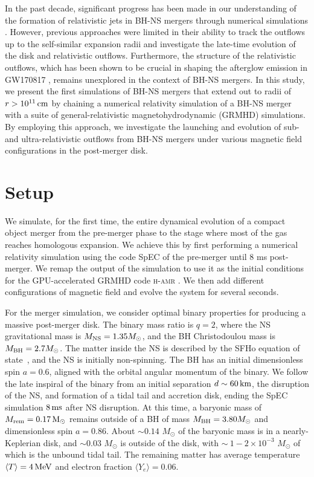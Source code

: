 \documentclass[twocolumn,dvipsnames]{aastex62}
\newcommand{\msun}{\,{M_{\odot}}}
\begin{document}
In the past decade, significant progress has been made in our understanding of the formation of relativistic jets in BH-NS mergers through numerical simulations \citep{Etienne2012,Kiuchi2015,Paschalidis2015,Ruiz2018,Hayashi2022a,Hayashi2022b}. However, previous approaches were limited in their ability to track the outflows up to the self-similar expansion radii and investigate the late-time evolution of the disk and relativistic outflows. Furthermore, the structure of the relativistic outflows, which has been shown to be crucial in shaping the afterglow emission in GW170817 \citep[e.g.,][]{Alexander2017,Margutti2017,Mooley2018a,Mooley2018b,Lazzati2018,Lyman2018,Troja2018,Ghirlanda2019,Lamb2019}, remains unexplored in the context of BH-NS mergers. In this study, we present the first simulations of BH-NS mergers that extend out to radii of $r > 10^{11}\,{\rm cm} $ by chaining a numerical relativity simulation of a BH-NS merger with a suite of general-relativistic magnetohydrodynamic (GRMHD) simulations. By employing this approach, we investigate the launching and evolution of sub- and ultra-relativistic outflows from BH-NS mergers under various magnetic field configurations in the post-merger disk.

\section{Setup}\label{sec:setup}

We simulate, for the first time, the entire dynamical evolution of a compact object merger from the pre-merger phase to the stage where most of the gas reaches homologous expansion. We achieve this by first performing a numerical relativity simulation using the code SpEC \citep{spec} of the pre-merger until 8 ms post-merger. We remap the output of the simulation to use it as the initial conditions for the GPU-accelerated GRMHD code \textsc{h-amr} \citep{Liska2022}. We then add different configurations of magnetic field and evolve the system for several seconds.

For the merger simulation, we consider optimal binary properties for producing a massive post-merger disk. The binary mass ratio is $ q = 2 $, where the NS gravitational mass is $M_{\rm NS}=1.35M_\odot$, and the BH Christodoulou mass is $M_{\rm BH}=2.7M_\odot$. The matter inside the NS is described by the SFHo equation of state~\citep{2013ApJ...774...17S}, and the NS is initially non-spinning. The BH has an initial dimensionless spin $a=0.6$, aligned with the orbital angular momentum of the binary. We follow the late inspiral of the binary from an initial separation $d\sim 60\,{\rm km}$, the disruption of the NS, and formation of a tidal tail and accretion disk, ending the SpEC simulation $8\,{\rm ms}$ after NS disruption. At this time, a baryonic mass of $M_{\rm rem}=0.17\,{\rm M_\odot}$ remains outside of a BH of mass $M_{\rm BH}=3.80M_\odot$ and dimensionless spin $a=0.86$. About $ \sim 0.14\,\msun $ of the baryonic mass is in a nearly-Keplerian disk, and $ \sim 0.03\,\msun $ is outside of the disk, with $ \sim~1-2\times 10^{-3}\,\msun $ of which is the unbound tidal tail. The remaining matter has average temperature $\langle T\rangle = 4\,{\rm MeV}$ and electron fraction $\langle Y_e\rangle =0.06$.
\end{document}

